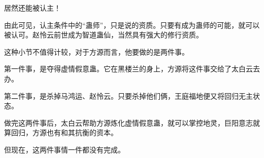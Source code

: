 \begin{this_body}
居然还能被认主！

由此可见，认主条件中的“蛊师”，只是说的资质。只要有成为蛊师的可能，就可以被认可。赵怜云前世成为智道蛊仙，当然具有强大的修行资质。

这种小节不值得计较，对于方源而言，他要做的是两件事。

第一件事，是夺得虚情假意蛊。它在黑楼兰的身上，方源将这件事交给了太白云去办。

第二件事，是杀掉马鸿运、赵怜云。只要杀掉他们俩，王庭福地便又将回归无主状态。

做完这两件事后，太白云帮助方源炼化虚情假意蛊，就可以掌控地灵，巨阳意志就算回归，方源也有和其抗衡的资本。

但现在，这两件事情一件都没有完成。

\end{this_body}


